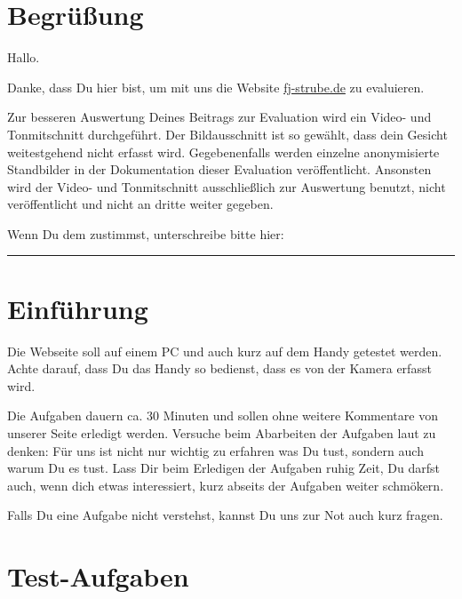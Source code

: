 \section{Begrüßung}
Hallo.

Danke, dass Du hier bist, um mit uns die Website \url{fj-strube.de} zu evaluieren.

Zur besseren Auswertung Deines Beitrags zur Evaluation wird ein Video- und Tonmitschnitt durchgeführt. Der Bildausschnitt ist so gewählt, dass dein Gesicht weitestgehend nicht erfasst wird. Gegebenenfalls werden einzelne anonymisierte Standbilder in der Dokumentation dieser Evaluation veröffentlicht. Ansonsten wird der Video- und Tonmitschnitt ausschließlich zur Auswertung benutzt, nicht veröffentlicht und nicht an dritte weiter gegeben.

Wenn Du dem zustimmst, unterschreibe bitte hier:

\vspace*{3em}
\noindent\rule{8cm}{0.4pt}

\section{Einführung}
Die Webseite soll auf einem PC und auch kurz auf dem Handy getestet werden. Achte darauf, dass Du das Handy so bedienst, dass es von der Kamera erfasst wird.

Die Aufgaben dauern ca. 30 Minuten und sollen ohne weitere Kommentare von unserer Seite erledigt werden. Versuche beim Abarbeiten der Aufgaben laut zu denken: Für uns ist nicht nur wichtig zu erfahren was Du tust, sondern auch warum Du es tust. Lass Dir beim Erledigen der Aufgaben ruhig Zeit, Du darfst auch, wenn dich etwas interessiert, kurz abseits der Aufgaben weiter schmökern.

Falls Du eine Aufgabe nicht verstehst, kannst Du uns zur Not auch kurz fragen.

\clearpage
\section{Test-Aufgaben}
